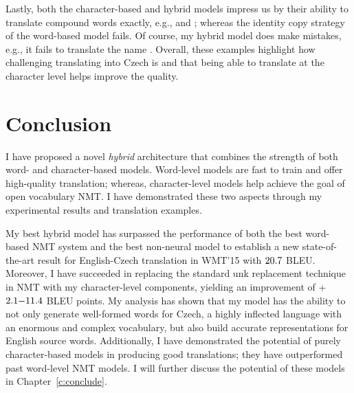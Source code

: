 Lastly, both the character-based and hybrid models impress us by
their ability to translate compound words exactly, e.g.,  and
; whereas the identity copy
strategy of the word-based model fails.
Of course, my hybrid model does make mistakes, e.g., it fails to translate the name
. 
Overall, these examples highlight how challenging translating
into Czech is and that being able to translate at the character level helps
improve the quality.

\section{Conclusion}
\label{sec:conclude}
I have proposed a novel {\it hybrid} architecture that combines the strength
of both word- and character-based models. Word-level models are fast to train
and offer high-quality translation; whereas, character-level models help achieve
the goal of open vocabulary NMT. 
I have demonstrated these two aspects through my experimental results and
translation examples.

My best hybrid model has surpassed the performance of both the best word-based
NMT system and the best non-neural model to establish a new state-of-the-art result for 
English-Czech translation in WMT'15 with $20.7{}$ BLEU.
Moreover, I have succeeded in replacing the standard unk replacement technique
in NMT with my character-level components, yielding an improvement of 
+$2.1{-}11.4{}$ BLEU points. My analysis has shown that my model has the ability to
not only generate well-formed words for
Czech, a highly inflected language with an enormous and complex vocabulary, but
also build accurate representations for English source words.
Additionally, I have demonstrated the potential of purely character-based
models in producing good translations;
they have outperformed past word-level NMT models. 
I will further discuss the potential of these models in Chapter~\ref{c:conclude}.
